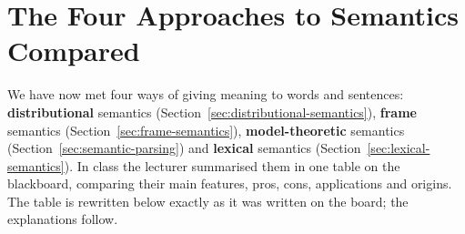 \section{The Four Approaches to Semantics Compared}
\label{sec:semantics-comparison}

We have now met four ways of giving meaning to words and sentences:
\textbf{distributional} semantics (Section~\ref{sec:distributional-semantics}),
\textbf{frame} semantics (Section~\ref{sec:frame-semantics}),
\textbf{model-theoretic} semantics (Section~\ref{sec:semantic-parsing}) and
\textbf{lexical} semantics (Section~\ref{sec:lexical-semantics}). In class the lecturer
summarised them in one table on the blackboard, comparing their main features, pros,
cons, applications and origins. The table is rewritten below exactly as it was written on
the board; the explanations follow.

